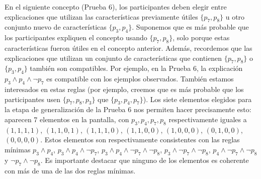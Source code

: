 \begin{hyp}
En el siguiente concepto (Prueba 6), los participantes deben elegir entre explicaciones que utilizan las
características previamente útiles $\{p_7, p_8 \}$ u otro conjunto nuevo de características $\{p_3, p_4 \}$.
Suponemos que es más probable que los participantes expliquen el concepto usando $\{p_7, p_8 \}$, solo porque estas características fueron útiles en el concepto anterior. Además, recordemos que las explicaciones que utilizan un conjunto de características que contienen $\{p_7, p_8 \}$ o $\{p_3, p_4 \}$ también son compatibles. Por ejemplo, en la Prueba 6, la explicación $p_3 \land p_4 \land \lnot p_7$ es compatible con los ejemplos observados. También estamos interesados en estas reglas (por ejemplo, creemos que es más probable que los participantes usen $\{p_7, p_8, p_3 \}$ que $\{p_3, p_4, p_7 \}$).  Los siete elementos elegidos para la etapa de generalización de la Prueba 6 nos permiten hacer precisamente esto: aparecen 7 elementos en la pantalla, con $p_3, p_4, p_7, p_8$ respectivamente iguales a $ (1, 1, 1, 1) $, $ (1, 1, 0, 1) $, $ (1, 1, 1, 0) $, $ (1, 1, 0, 0) $, $ (1, 0, 0, 0) $, $ ( 0, 1, 0, 0) $, $ (0, 0, 0, 0) $. Estos elementos son respectivamente consistentes con las reglas mínimas $p_3 \land p_4 $, $ p_3 \land p_4 \land \lnot p_7 $, $ p_3 \land p_4 \land \lnot p_7 \land \lnot p_8 $, $ p_3 \land \lnot p_7 \land \lnot p_8 $, $ p_4 \land \lnot p_7 \land \lnot p_8 $ y $ \lnot p_7 \land \lnot p_8 $. Es importante destacar que ninguno de los elementos es coherente con más de una de las dos reglas mínimas.


\end{hyp}
